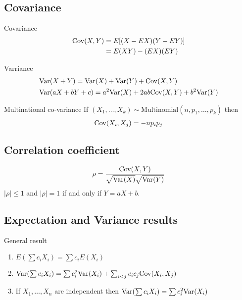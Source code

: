 \documentclass[16pt,a4paper]{article}
\begin{document}
\subsection{Covariance}
\begin{defn}{Covariance}
\begin{align*}
\mathrm{Cov}(X,Y) &= E[(X-EX)(Y-EY)]\\
&= E(XY) - (EX)(EY)
\end{align*}
\end{defn}

\begin{defn}{Varriance}
\begin{align*}
&\mathrm{Var}(X+Y) = \mathrm{Var}(X) + \mathrm{Var}(Y) + \mathrm{Cov}(X,Y)\\
&\mathrm{Var}(aX+bY+c) = a^2\mathrm{Var}(X) + 2ab\mathrm{Cov}(X,Y) + b^2\mathrm{Var}(Y)
\end{align*}
\end{defn}
\begin{thm}{Multinational co-variance}
If $(X_1, \ldots, X_k) \sim \text{Multinomial}(n, p_1, \ldots, p_k)$ then 
\begin{align*}
\mathrm{Cov}(X_i,X_j) = -np_ip_j
\end{align*}
\end{thm}

\subsection{Correlation coefficient}
\begin{defn}{}
\begin{align*}
\rho = \frac{\mathrm{Cov}(X,Y)}{\sqrt{\mathrm{Var}(X)}\sqrt{\mathrm{Var}(Y)}}
\end{align*}
$|\rho| \leq 1$ and $|\rho| = 1$ if and only if $Y = aX+b$. 
\end{defn}
\newpage
\subsection{Expectation and Variance results}
\begin{thm}{General result}
\begin{enumerate}[(1)]
\item $E(\sum c_iX_i) = \sum c_iE(X_i)$
\item $\mathrm{Var}(\sum c_iX_i) = \sum c_i^2\mathrm{Var}(X_i) + \sum_{i<j}c_ic_j\mathrm{Cov}(X_i,X_j)$
\item If $X_1, \ldots,X_n$ are independent then   $\mathrm{Var}(\sum c_iX_i) = \sum c_i^2\mathrm{Var}(X_i)$
\end{enumerate}
\end{thm}
\end{document}
